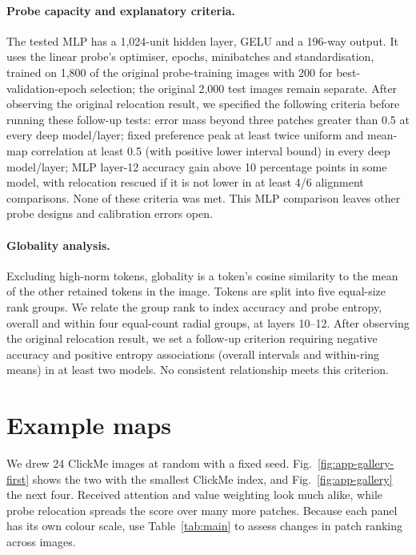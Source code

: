 \paragraph{Probe capacity and explanatory criteria.} The tested MLP has a 1,024-unit hidden layer, GELU and a 196-way output. It uses the linear probe's optimiser, epochs, minibatches and standardisation, trained on 1,800 of the original probe-training images with 200 for best-validation-epoch selection; the original 2,000 test images remain separate. After observing the original relocation result, we specified the following criteria before running these follow-up tests: error mass beyond three patches greater than 0.5 at every deep model/layer; fixed preference peak at least twice uniform and mean-map correlation at least 0.5 (with positive lower interval bound) in every deep model/layer; MLP layer-12 accuracy gain above 10 percentage points in some model, with relocation rescued if it is not lower in at least 4/6 alignment comparisons. None of these criteria was met. This MLP comparison leaves other probe designs and calibration errors open.

\paragraph{Globality analysis.} Excluding high-norm tokens, globality is a token's cosine similarity to the mean of the other retained tokens in the image. Tokens are split into five equal-size rank groups. We relate the group rank to index accuracy and probe entropy, overall and within four equal-count radial groups, at layers 10--12. After observing the original relocation result, we set a follow-up criterion requiring negative accuracy and positive entropy associations (overall intervals and within-ring means) in at least two models. No consistent relationship meets this criterion.

\clearpage
\section{Example maps}
\label{app:gallery}

We drew 24 ClickMe images at random with a fixed seed. Fig.~\ref{fig:app-gallery-first} shows the two with the smallest ClickMe index, and Fig.~\ref{fig:app-gallery} the next four. Received attention and value weighting look much alike, while probe relocation spreads the score over many more patches. Because each panel has its own colour scale, use Table~\ref{tab:main} to assess changes in patch ranking across images.

